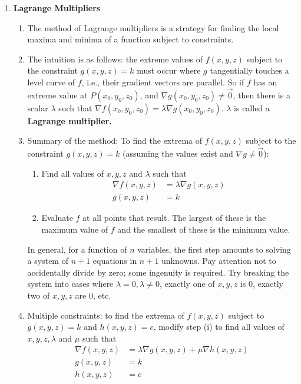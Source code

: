 \documentclass[10pt]{article}
\begin{document}
\begin{multicols*}{2}
\begin{enumerate}
    \item \textbf{Lagrange Multipliers}
    \begin{enumerate}
        \item The method of Lagrange multipliers is a strategy for finding the local maxima and minima of a function subject to constraints. 
        \item The intuition is as follows: the extreme values of $f(x,y,z)$ subject to the constraint $g(x,y,z)=k$ must occur where $g$ tangentially touches a level curve of $f$, i.e., their gradient vectors are parallel. So if $f$ has an extreme value at $P(x_0, y_0, z_0)$, and $\nabla g(x_0, y_0, z_0) \neq \vec{0}$, then there is a scalar $\lambda$ such that $\nabla f(x_0, y_0, z_0) = \lambda \nabla g(x_0, y_0, z_0)$. $\lambda$ is called a \textbf{Lagrange multiplier.}
        \item Summary of the method: To find the extrema of $f(x,y,z)$ subject to the constraint $g(x,y,z)=k$ (assuming the values exist and $\nabla g \neq \vec{0}$):
        \begin{enumerate}
            \item Find all values of $x,y,z$ and $\lambda$ such that 
            \begin{align*}
                \nabla f(x, y, z) &= \lambda \nabla g(x, y, z) \\
                g(x,y,z)&=k
            \end{align*}
            \item Evaluate $f$ at all points that result. The largest of these is the maximum value of $f$ and the smallest of these is the minimum value.
        \end{enumerate}
        In general, for a function of $n$ variables, the first step amounts to solving a system of $n+1$ equations in $n+1$ unknowns. Pay attention not to accidentally divide by zero; some ingenuity is required. Try breaking the system into cases where $\lambda = 0, \lambda \neq 0$, exactly one of $x,y,z$ is $0$, exactly two of $x,y,z$ are $0$, etc.
        \item Multiple constraints: to find the extrema of $f(x,y,z)$ subject to $g(x,y,z)=k$ and $h(x,y,z)=c$, modify step (i) to find all values of $x,y,z,\lambda$ and $\mu$ such that
        \begin{align*}
            \nabla f(x, y, z) &= \lambda \nabla g(x, y, z) + \mu \nabla h(x,y,z) \\
            g(x,y,z) &= k \\
            h(x,y,z) &= c
        \end{align*}
    \end{enumerate}
    

\end{enumerate}
\end{multicols*}
\end{document}
